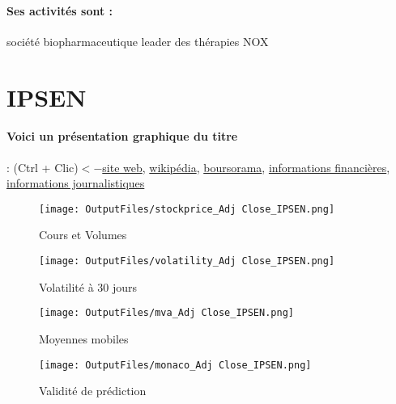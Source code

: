\documentclass[11pt,a4paper]{report}%
\begin{document}
\paragraph{Ses activités sont : } société biopharmaceutique leader des thérapies NOX 
    
    \newpage

\section{IPSEN}

\paragraph{Voici un présentation graphique du titre} : (Ctrl + Clic)$<-$\href{https://www.ipsen.com/fr/investisseurs-2/resultats-financiers/}{site web}, \href{https://fr.wikipedia.org/wiki/Ipsen}{wikipédia}, \href{https://www.boursorama.com/cours/1rPIPN}{boursorama}, \href{https://www.qwant.com/?q=site:https:%2f%2fwww.easybourse.com%2faction-societe%2fIPSEN&t=web&client=ext-firefox-hp}{informations financières}, \href{https://bourse.lerevenu.com/cours-de-bourse/fiche-valeur-synthese/IPSEN/IPN-FR}{informations journalistiques}
\begin{figure}[!htb]
   \begin{minipage}{0.5\textwidth}
     \centering
     \texttt{[image: OutputFiles/stockprice\_Adj Close\_IPSEN.png]}
     \caption{Cours et Volumes}\label{Fig:price_IPSEN}
   \end{minipage}\hfill
   \begin{minipage}{0.5\textwidth}
     \centering
     \texttt{[image: OutputFiles/volatility\_Adj Close\_IPSEN.png]}
     \caption{Volatilité à 30 jours}\label{Fig:volat_IPSEN}
   \end{minipage}
\end{figure}
\begin{figure}[!htb]
   \begin{minipage}{0.5\textwidth}
     \centering
     \texttt{[image: OutputFiles/mva\_Adj Close\_IPSEN.png]}
     \caption{Moyennes mobiles}\label{Fig:mva_IPSEN}
   \end{minipage}\hfill
   \begin{minipage}{0.5\textwidth}
     \centering
     \texttt{[image: OutputFiles/monaco\_Adj Close\_IPSEN.png]}
     \caption{Validité de prédiction}\label{Fig:prediction_IPSEN}
   \end{minipage}
\end{figure}
\end{document}
